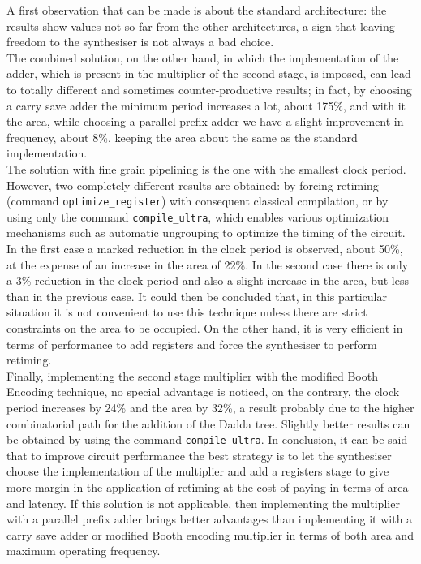 \noindent A first observation that can be made is about the standard architecture: the results show values not so far from the other architectures, a sign that leaving freedom to the synthesiser is not always a bad choice.\\
The combined solution, on the other hand, in which the implementation of the adder, which is present in the multiplier of the second stage, is imposed, can lead to totally different and sometimes counter-productive results; in fact, by choosing a carry save adder the minimum period increases a lot, about 175\%, and with it the area, while choosing a parallel-prefix adder we have a slight improvement in frequency, about 8\%, keeping the area about the same as the standard implementation.\\
The solution with fine grain pipelining is the one with the smallest clock period. However, two completely different results are obtained: by forcing retiming (command \texttt{optimize\_register}) with consequent classical compilation, or by using only the command \texttt{compile\_ultra}, which enables various optimization mechanisms such as automatic ungrouping to optimize the timing of the circuit. In the first case a marked reduction in the clock period is observed, about 50\%, at the expense of an increase in the area of 22\%. In the second case there is only a 3\% reduction in the clock period and also a slight increase in the area, but less than in the previous case. It could then be concluded that, in this particular situation it is not convenient to use this technique unless there are strict constraints on the area to be occupied. On the other hand, it is very efficient in terms of performance to add registers and force the synthesiser to perform retiming.\\
Finally, implementing the second stage multiplier with the modified Booth Encoding technique, no special advantage is noticed, on the contrary, the clock period increases by 24\% and the area by 32\%, a result probably due to the higher combinatorial path for the addition of the Dadda tree. Slightly better results can be obtained by using the command \texttt{compile\_ultra}.
\medbreak
In conclusion, it can be said that to improve circuit performance the best strategy is to let the synthesiser choose the implementation of the multiplier and add a registers stage to give more margin in the application of retiming at the cost of paying in terms of area and latency. If this solution is not applicable, then implementing the multiplier with a parallel prefix adder brings better advantages than implementing it with a carry save adder or modified Booth encoding multiplier in terms of both area and maximum operating frequency.
